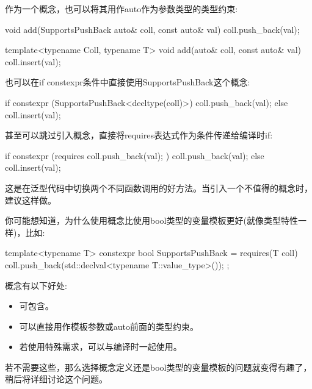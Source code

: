 作为一个概念，也可以将其用作auto作为参数类型的类型约束:

\begin{cpp}
void add(SupportsPushBack auto& coll, const auto& val)
{
	coll.push_back(val);
}

template<typename Coll, typename T>
void add(auto& coll, const auto& val)
{
	coll.insert(val);
}
\end{cpp}


也可以在if constexpr条件中直接使用SupportsPushBack这个概念:

\begin{cpp}
if constexpr (SupportsPushBack<decltype(coll)>) {
	coll.push_back(val);
}
else {
	coll.insert(val);
}
\end{cpp}


甚至可以跳过引入概念，直接将requires表达式作为条件传递给编译时if:

\begin{cpp}
if constexpr (requires { coll.push_back(val); }) {
	coll.push_back(val);
}
else {
	coll.insert(val);
}
\end{cpp}

这是在泛型代码中切换两个不同函数调用的好方法。当引入一个不值得的概念时，建议这样做。


你可能想知道，为什么使用概念比使用bool类型的变量模板更好(就像类型特性一样)，比如:

\begin{cpp}
template<typename T>
constexpr bool SupportsPushBack = requires(T coll) {
	coll.push_back(std::declval<typename T::value_type>());
};
\end{cpp}

概念有以下好处:

\begin{itemize}
\item
可包含。

\item
可以直接用作模板参数或auto前面的类型约束。

\item
若使用特殊需求，可以与编译时一起使用。
\end{itemize}

若不需要这些，那么选择概念定义还是bool类型的变量模板的问题就变得有趣了，稍后将详细讨论这个问题。



